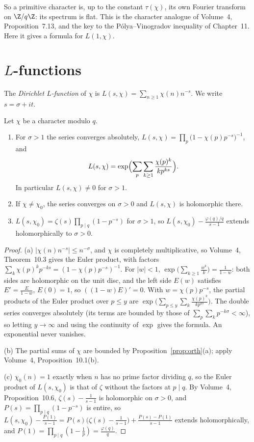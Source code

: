 So a primitive character is, up to the constant $\tau(\chi)$, its own Fourier transform on $\Z/q\Z$: its spectrum is flat. This is the
character analogue of Volume~4, Proposition~7.13, and the key to the Pólya--Vinogradov inequality of Chapter~11. Here it gives a formula for $L(1,\chi)$.

\section{\texorpdfstring{$L$}{L}-functions}

The \emph{Dirichlet $L$-function} of $\chi$ is $L(s,\chi)=\sum_{n\ge1}\chi(n)n^{-s}$. We write $s=\sigma+it$.

\begin{theorem}\label{thm:lbasic}
Let $\chi$ be a character modulo $q$.
\begin{enumerate}[label=(\alph*)]
\item For $\sigma>1$ the series converges absolutely, $L(s,\chi)=\prod_p\bigl(1-\chi(p)p^{-s}\bigr)^{-1}$, and
\[
L(s,\chi)=\exp\Bigl(\sum_p\sum_{k\ge1}\frac{\chi(p)^k}{kp^{ks}}\Bigr).
\]
In particular $L(s,\chi)\ne0$ for $\sigma>1$.
\item If $\chi\ne\chi_0$, the series converges on $\sigma>0$ and $L(s,\chi)$ is holomorphic there.
\item $L(s,\chi_0)=\zeta(s)\prod_{p\mid q}(1-p^{-s})$ for $\sigma>1$, so $L(s,\chi_0)-\frac{\varphi(q)/q}{s-1}$ extends holomorphically to $\sigma>0$.
\end{enumerate}
\end{theorem}
\begin{proof}
(a) $|\chi(n)n^{-s}|\le n^{-\sigma}$, and $\chi$ is completely multiplicative, so Volume~4, Theorem~10.3 gives the Euler product, with factors
$\sum_k\chi(p)^kp^{-ks}=(1-\chi(p)p^{-s})^{-1}$. For $|w|<1$, $\exp\bigl(\sum_{k\ge1}\frac{w^k}k\bigr)=\frac1{1-w}$: both sides are holomorphic on the unit disc, and the
left side $E(w)$ satisfies $E'=\frac E{1-w}$, $E(0)=1$, so $((1-w)E)'=0$. With $w=\chi(p)p^{-s}$, the partial products of the Euler product over $p\le y$
are $\exp\bigl(\sum_{p\le y}\sum_k\frac{\chi(p)^k}{kp^{ks}}\bigr)$. The double series converges absolutely (its terms are bounded by those of
$\sum_p\sum_kp^{-k\sigma}<\infty$), so letting $y\to\infty$ and using the continuity of $\exp$ gives the formula. An exponential never vanishes.

(b) The partial sums of $\chi$ are bounded by Proposition~\ref{prop:orth}(a); apply Volume~4, Proposition~10.1(b).

(c) $\chi_0(n)=1$ exactly when $n$ has no prime factor dividing $q$, so the Euler product of $L(s,\chi_0)$ is that of $\zeta$ without the factors at
$p\mid q$. By Volume~4, Proposition~10.6, $\zeta(s)-\frac1{s-1}$ is holomorphic on $\sigma>0$, and $P(s)=\prod_{p\mid q}(1-p^{-s})$ is entire, so
$L(s,\chi_0)-\frac{P(1)}{s-1}=P(s)\bigl(\zeta(s)-\frac1{s-1}\bigr)+\frac{P(s)-P(1)}{s-1}$ extends holomorphically, and $P(1)=\prod_{p\mid q}(1-\frac1p)=\frac{\varphi(q)}q$.
\end{proof}

